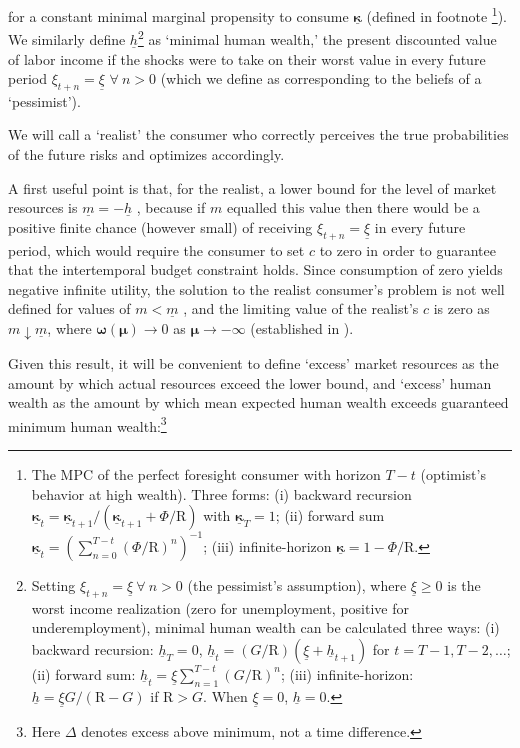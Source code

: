 \documentclass[twocolumn, switch]{article}
\newcommand{\cNrm}{c}
\newcommand{\Rfree}{\text{R}}
\newcommand{\tranShk}{\xi}
\newcommand{\PermGroFac}{G}
\newcommand{\mNrm}{m}
\newcommand{\AbsPatFac}{\Phi}
\newcommand{\hNrm}{h}
\newcommand{\MPC}{\boldsymbol{\kappa}}
\newcommand{\MPCmin}{\underline{\MPC}}
\newcommand{\hNrmPes}{\underline{\hNrm}}
\newcommand{\tranShkMin}{\underline{\tranShk}}
\newcommand{\mNrmMin}{\underline{\mNrm}}
\newcommand{\logmNrmEx}{\boldsymbol{\mu}}
\newcommand{\modRte}{\boldsymbol{\omega}}
\begin{document}
for a constant minimal marginal propensity to consume $\MPCmin$ (defined in footnote \footnote{The MPC of the perfect foresight consumer with horizon $T -t$ (optimist's behavior at high wealth). Three forms: (i) backward recursion $\MPCmin_{t}=\MPCmin_{t+1}/(\MPCmin_{t+1}+\AbsPatFac/\Rfree)$ with $\MPCmin_T=1$; (ii) forward sum $\MPCmin_{t}=(\sum_{n=0}^{T -t}(\AbsPatFac/\Rfree)^{n})^{ -1}$; (iii) infinite-horizon $\MPCmin=1 -\AbsPatFac/\Rfree$.}). We similarly define
$\hNrmPes$\footnote{Setting $\tranShk_{t+n}=\tranShkMin~\forall~n>0$ (the pessimist's assumption), where $\tranShkMin \geq 0$ is the worst income realization (zero for unemployment, positive for underemployment), minimal human wealth can be calculated three ways: (i) backward recursion: $\hNrmPes_{T}=0$, $\hNrmPes_{t}=(\PermGroFac/\Rfree)(\tranShkMin + \hNrmPes_{t+1})$ for $t = T -1, T -2, \ldots$; (ii) forward sum: $\hNrmPes_{t}=\tranShkMin\sum_{n=1}^{T -t}(\PermGroFac/\Rfree)^{n}$; (iii) infinite-horizon: $\hNrmPes=\tranShkMin\PermGroFac/(\Rfree -\PermGroFac)$ if $\Rfree>\PermGroFac$. When $\tranShkMin=0$, $\hNrmPes=0$.} as `minimal human wealth,' the present
discounted value of labor income if the shocks were to take on their worst
value in every future period
$\tranShk_{t+n} = \tranShkMin$ $\forall~n>0$ (which we define as corresponding to the beliefs of a `pessimist').

We will call a `realist' the consumer who correctly perceives the true
probabilities of the future risks and optimizes accordingly.

A first useful point is that, for the realist, a lower bound for the level of
market resources is $\mNrmMin = -\hNrmPes$ \citep{Aiyagari1994, Huggett1993}, because if $\mNrm$
equalled this value then there would be a positive finite chance (however small)
of receiving $\tranShk_{t+n} = \tranShkMin$ in every future period, which
would require the consumer to set $\cNrm$ to zero in order to guarantee that the
intertemporal budget constraint holds. Since consumption of zero yields negative
infinite utility, the solution to the realist consumer's problem is not well
defined for values of $\mNrm < \mNrmMin$ \citep{Zeldes1989, Deaton1991}, and the limiting value of the
realist's $\cNrm$ is zero as $\mNrm \downarrow \mNrmMin$, where $\modRte(\logmNrmEx) \to 0$ as $\logmNrmEx \to -\infty$ (established in \citet{CarrollShanker2024}).

Given this result, it will be convenient to define `excess' market resources as
the amount by which actual resources exceed the lower bound, and `excess' human
wealth as the amount by which mean expected human wealth exceeds guaranteed
minimum human wealth:\footnote{Here $\Delta$ denotes excess above minimum, not a time difference.}
\end{document}
